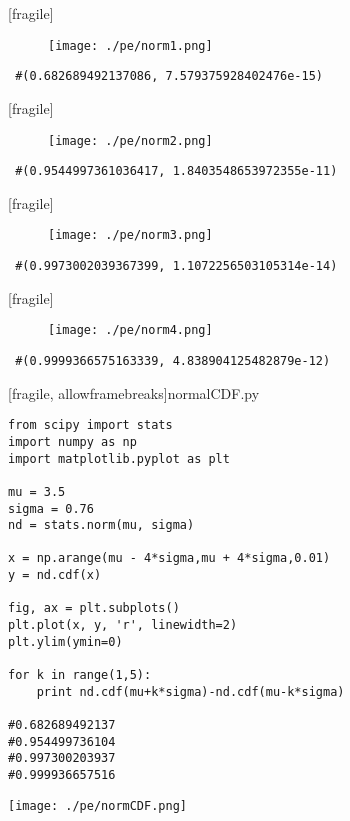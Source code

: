 [fragile]
 \begin{figure}[h]
 \centering
 \texttt{[image: ./pe/norm1.png]}
 \label{fig:norm1}
\end{figure}
\begin{verbatim}
 #(0.682689492137086, 7.579375928402476e-15)
\end{verbatim}


[fragile]
 \begin{figure}[h]
 \centering
 \texttt{[image: ./pe/norm2.png]}
 \label{fig:norm2}
\end{figure}
\begin{verbatim}
 #(0.9544997361036417, 1.8403548653972355e-11)
\end{verbatim}


[fragile]
 \begin{figure}[h]
 \centering
 \texttt{[image: ./pe/norm3.png]}
 \label{fig:norm3}
\end{figure}
\begin{verbatim}
 #(0.9973002039367399, 1.1072256503105314e-14)
\end{verbatim}


[fragile]
 \begin{figure}[h]
 \centering
 \texttt{[image: ./pe/norm4.png]}
 \label{fig:norm4}
\end{figure}
\begin{verbatim}
 #(0.9999366575163339, 4.838904125482879e-12)
\end{verbatim}


[fragile, allowframebreaks]{normalCDF.py}
 \begin{verbatim}
from scipy import stats
import numpy as np
import matplotlib.pyplot as plt

mu = 3.5
sigma = 0.76
nd = stats.norm(mu, sigma)

x = np.arange(mu - 4*sigma,mu + 4*sigma,0.01)
y = nd.cdf(x)

fig, ax = plt.subplots()
plt.plot(x, y, 'r', linewidth=2)
plt.ylim(ymin=0)

for k in range(1,5):
    print nd.cdf(mu+k*sigma)-nd.cdf(mu-k*sigma)

#0.682689492137
#0.954499736104
#0.997300203937
#0.999936657516
 \end{verbatim}
\begin{center}
 \texttt{[image: ./pe/normCDF.png]}
\end{center}



